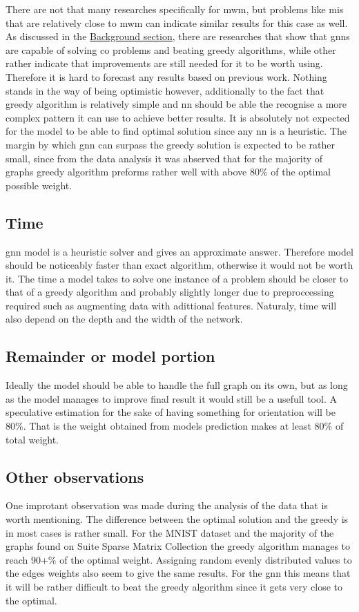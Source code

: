 There are not that many researches specifically for \gls{mwm}, but problems like \gls{mis} that are relatively close to \gls{mwm} can indicate similar results for this case as well. As discussed in the \hyperref[sec:background]{Background section}, there are researches that show that \gls{gnn}s are capable of solving \gls{co} problems and beating greedy algorithms, while other rather indicate that improvements are still needed for it to be worth using. Therefore it is hard to forecast any results based on previous work. Nothing stands in the way of being optimistic however, additionally to the fact that greedy algorithm is relatively simple and \gls{nn} should be able the recognise a more complex pattern it can use to achieve better results. It is absolutely not expected for the model to be able to find optimal solution since any \gls{nn} is a heuristic. The margin by which \gls{gnn} can surpass the greedy solution is expected to be rather small, since from the data analysis it was abserved that for the majority of graphs greedy algorithm preforms rather well with above 80\% of the optimal possible weight.

\subsection{Time}

\gls{gnn} model is a heuristic solver and gives an approximate answer. Therefore model should be noticeably faster than exact algorithm, otherwise it would not be worth it. The time a model takes to solve one instance of a problem should be closer to that of a greedy algorithm and probably slightly longer due to preproccessing required such as augmenting data with adittional features. Naturaly, time will also depend on the depth and the width of the network.

\subsection{Remainder or model portion}

Ideally the model should be able to handle the full graph on its own, but as long as the model manages to improve final result it would still be a usefull tool. A speculative estimation for the sake of having something for orientation will be 80\%. That is the weight obtained from models prediction makes at least 80\% of total weight.

\subsection{Other observations}

One improtant observation was made during the analysis of the data that is worth mentioning. The difference between the optimal solution and the greedy is in most cases is rather small. For the MNIST dataset and the majority of the graphs found on Suite Sparse Matrix Collection the greedy algorithm manages to reach 90+\% of the optimal weight. Assigning random evenly distributed values to the edges weights also seem to give the same results. For the \gls{gnn} this means that it will be rather difficult to beat the greedy algorithm since it gets very close to the optimal.
